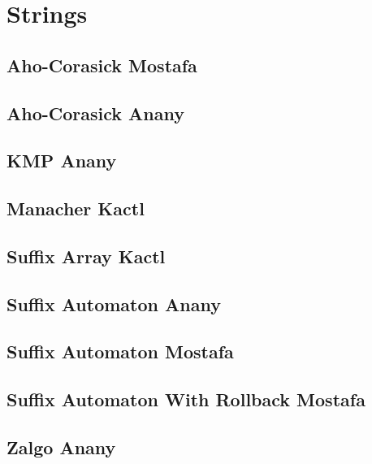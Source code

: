 \section{Strings}
\subsection{Aho-Corasick Mostafa}
\raggedbottom
\hrulefill
\subsection{Aho-Corasick Anany}
\raggedbottom
\hrulefill
\subsection{KMP Anany}
\raggedbottom
\hrulefill
\subsection{Manacher Kactl}
\raggedbottom
\hrulefill
\subsection{Suffix Array Kactl}
\raggedbottom
\hrulefill
\subsection{Suffix Automaton Anany}
\raggedbottom
\hrulefill
\subsection{Suffix Automaton Mostafa}
\raggedbottom
\hrulefill
\subsection{Suffix Automaton With Rollback Mostafa}
\raggedbottom
\hrulefill
\subsection{Zalgo Anany}
\raggedbottom
\hrulefill


